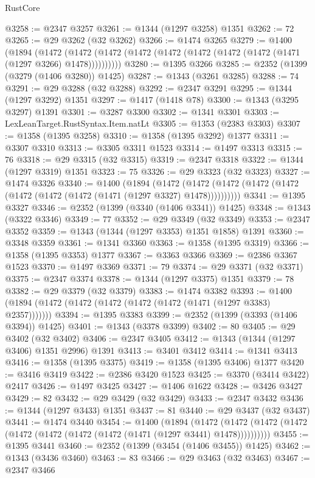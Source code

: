 \begin{lexlean}{RustCore}
\begin{coremodule}
@3258 := @2347 @3257
@3261 := @1344 (@1297 @3258) @1351
@3262 := 72
@3265 := @29 @3262 (@32 @3262)
@3266 := @1474 @3265
@3279 := @1400
    (@1894
      (@1472 (@1472 (@1472 (@1472 (@1472 (@1472 (@1472 (@1472 (@1471 (@1297 @3266) @1478))))))))))
@3280 := @1395 @3266
@3285 := @2352 (@1399 (@3279 (@1406 @3280)) @1425)
@3287 := @1343 (@3261 @3285)
@3288 := 74
@3291 := @29 @3288 (@32 @3288)
@3292 := @2347 @3291
@3295 := @1344 (@1297 @3292) @1351
@3297 := @1417 (@1418 @78)
@3300 := @1343 (@3295 @3297) @1391
@3301 := @3287 @3300
@3302 := @1341 @3301
@3303 := LexLeanTarget.RustSyntax.Item.natLt
@3305 := @1353 (@2383 @3303)
@3307 := @1358 (@1395 @3258)
@3310 := @1358 (@1395 @3292) @1377
@3311 := @3307 @3310
@3313 := @3305 @3311 @1523
@3314 := @1497 @3313
@3315 := 76
@3318 := @29 @3315 (@32 @3315)
@3319 := @2347 @3318
@3322 := @1344 (@1297 @3319) @1351
@3323 := 75
@3326 := @29 @3323 (@32 @3323)
@3327 := @1474 @3326
@3340 := @1400
    (@1894
      (@1472 (@1472 (@1472 (@1472 (@1472 (@1472 (@1472 (@1472 (@1471 (@1297 @3327) @1478))))))))))
@3341 := @1395 @3327
@3346 := @2352 (@1399 (@3340 (@1406 @3341)) @1425)
@3348 := @1343 (@3322 @3346)
@3349 := 77
@3352 := @29 @3349 (@32 @3349)
@3353 := @2347 @3352
@3359 := @1343 (@1344 (@1297 @3353) @1351 @1858) @1391
@3360 := @3348 @3359
@3361 := @1341 @3360
@3363 := @1358 (@1395 @3319)
@3366 := @1358 (@1395 @3353) @1377
@3367 := @3363 @3366
@3369 := @2386 @3367 @1523
@3370 := @1497 @3369
@3371 := 79
@3374 := @29 @3371 (@32 @3371)
@3375 := @2347 @3374
@3378 := @1344 (@1297 @3375) @1351
@3379 := 78
@3382 := @29 @3379 (@32 @3379)
@3383 := @1474 @3382
@3393 := @1400 (@1894 (@1472 (@1472 (@1472 (@1472 (@1472 (@1471 (@1297 @3383) @2357)))))))
@3394 := @1395 @3383
@3399 := @2352 (@1399 (@3393 (@1406 @3394)) @1425)
@3401 := @1343 (@3378 @3399)
@3402 := 80
@3405 := @29 @3402 (@32 @3402)
@3406 := @2347 @3405
@3412 := @1343 (@1344 (@1297 @3406) @1351 @2996) @1391
@3413 := @3401 @3412
@3414 := @1341 @3413
@3416 := @1358 (@1395 @3375)
@3419 := @1358 (@1395 @3406) @1377
@3420 := @3416 @3419
@3422 := @2386 @3420 @1523
@3425 := @3370 (@3414 @3422) @2417
@3426 := @1497 @3425
@3427 := @1406 @1622
@3428 := @3426 @3427
@3429 := 82
@3432 := @29 @3429 (@32 @3429)
@3433 := @2347 @3432
@3436 := @1344 (@1297 @3433) @1351
@3437 := 81
@3440 := @29 @3437 (@32 @3437)
@3441 := @1474 @3440
@3454 := @1400
    (@1894
      (@1472 (@1472 (@1472 (@1472 (@1472 (@1472 (@1472 (@1472 (@1471 (@1297 @3441) @1478))))))))))
@3455 := @1395 @3441
@3460 := @2352 (@1399 (@3454 (@1406 @3455)) @1425)
@3462 := @1343 (@3436 @3460)
@3463 := 83
@3466 := @29 @3463 (@32 @3463)
@3467 := @2347 @3466

\end{coremodule}
\end{lexlean}
